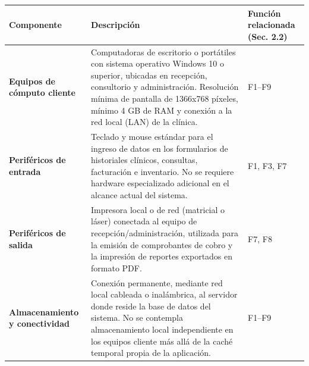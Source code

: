 {\def\LTcaptype{none} %
\begin{longtable}[]{@{}
  >{\raggedright\arraybackslash}p{}
  >{\raggedright\arraybackslash}p{}
  >{\raggedright\arraybackslash}p{}@{}}
\toprule\noalign{}
\begin{minipage}[b]{\linewidth}\raggedright
\textbf{Componente}
\end{minipage} & \begin{minipage}[b]{\linewidth}\raggedright
\textbf{Descripción}
\end{minipage} & \begin{minipage}[b]{\linewidth}\raggedright
\textbf{Función relacionada (Sec.} \textbf{2.2)}
\end{minipage} \\
\midrule\noalign{}
\endhead
\bottomrule\noalign{}
\endlastfoot
\textbf{Equipos de cómputo cliente} &
\begin{minipage}[t]{\linewidth}\raggedright
Computadoras de escritorio o portátiles con sistema operativo Windows 10
o superior, ubicadas en recepción, consultorio y administración.
Resolución mínima de pantalla de 1366x768 píxeles, mínimo 4 GB de RAM y
conexión a la red local (LAN) de la clínica.
\end{minipage} & F1--F9 \\
\textbf{Periféricos de entrada} &
\begin{minipage}[t]{\linewidth}\raggedright
Teclado y mouse estándar para el ingreso de datos en los formularios de
historiales clínicos, consultas, facturación e inventario. No se
requiere hardware especializado adicional en el alcance actual del sistema.
\end{minipage} & F1, F3, F7 \\
\textbf{Periféricos de salida} &
\begin{minipage}[t]{\linewidth}\raggedright
Impresora local o de red (matricial o láser) conectada al equipo de
recepción/administración, utilizada para la emisión de comprobantes de
cobro y la impresión de reportes exportados en formato PDF.
\end{minipage} & F7, F8 \\
\textbf{Almacenamiento y conectividad} &
\begin{minipage}[t]{\linewidth}\raggedright
Conexión permanente, mediante red local cableada o inalámbrica, al
servidor donde reside la base de datos del sistema. No se contempla
almacenamiento local independiente en los equipos cliente más allá de la
caché temporal propia de la aplicación.
\end{minipage} & F1--F9 \\
\end{longtable}
}

